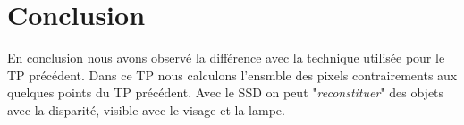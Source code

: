 \documentclass[a4paper,12pt]{report}
\begin{document}
\section*{Conclusion}

En conclusion nous avons observé la différence avec la technique utilisée pour le TP précédent. Dans ce TP nous calculons l'ensmble des pixels contrairements aux quelques points du TP précédent. Avec le SSD on peut "\textit{reconstituer}" des objets avec la disparité, visible avec le visage et la lampe. 
\end{document}
